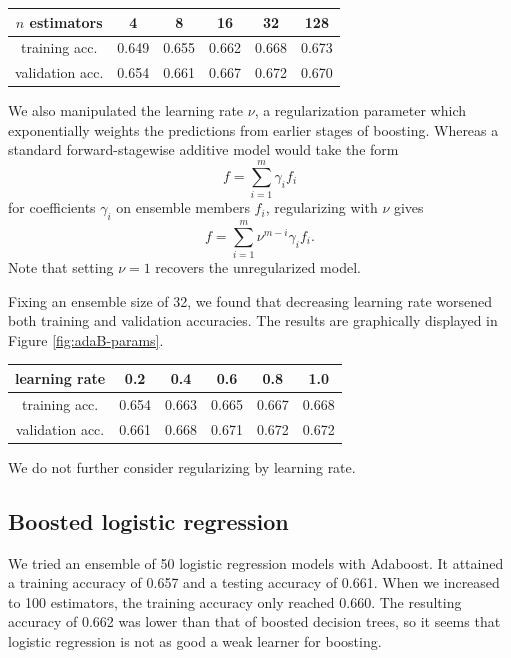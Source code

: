 \documentclass{article}
\begin{document}
\begin{multicols}{2}
\begin{center}
    \begin{tabular}{c|ccccc}
        $n$ estimators &
          4 & 8 & 16 & 32 & 128 \\\hline
        training acc. &
          0.649 & 0.655 & 0.662 & 0.668 & 0.673\\
        validation acc. &
          0.654 & 0.661 & 0.667 & 0.672 &0.670
    \end{tabular}
\end{center}

We also manipulated the learning rate $\nu$,
a regularization parameter which exponentially weights the predictions
from earlier stages of boosting.
Whereas a standard forward-stagewise additive model
would take the form
\begin{equation}
    f = \sum_{i=1}^m \gamma_i f_i
\end{equation}
for coefficients $\gamma_i$ on ensemble members $f_i$,
regularizing with $\nu$ gives
\begin{equation}
    f = \sum_{i=1}^m \nu^{m - i}\gamma_i f_i.
\end{equation}
Note that setting $\nu = 1$ recovers the unregularized model.

Fixing an ensemble size of 32,
we found that decreasing learning rate worsened both training
and validation accuracies.
The results are graphically displayed in Figure \ref{fig:adaB-params}.

\begin{center}
    \begin{tabular}{c|ccccc}
        learning rate &
          0.2 & 0.4 & 0.6 & 0.8 & 1.0 \\\hline
        training acc. &
          0.654& 0.663& 0.665& 0.667& 0.668\\
        validation acc. &
          0.661& 0.668& 0.671& 0.672& 0.672
    \end{tabular}
\end{center}

We do not further consider regularizing by learning rate.

\subsection{Boosted logistic regression}

We tried an ensemble of 50 
logistic regression models with Adaboost.
It attained a training accuracy of 0.657
and a testing accuracy of 0.661.
When we increased to 100 estimators,
the training accuracy only reached 0.660.
The resulting accuracy of 0.662
was lower than that of boosted decision trees,
so it seems that
logistic regression is not as good a
weak learner for boosting.



\end{multicols}
\end{document}
